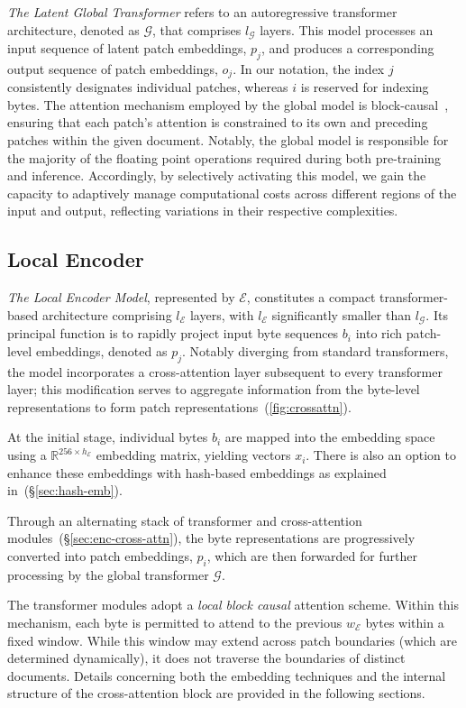 \textit{The Latent Global Transformer} refers to an autoregressive transformer architecture, denoted as $\mathcal{G}$, that comprises $l_{\mathcal{G}}$ layers. This model processes an input sequence of latent patch embeddings, $p_j$, and produces a corresponding output sequence of patch embeddings, $o_j$. In our notation, the index $j$ consistently designates individual patches, whereas $i$ is reserved for indexing bytes. The attention mechanism employed by the global model is block-causal~\citep{dubey2024llama}, ensuring that each patch's attention is constrained to its own and preceding patches within the given document. Notably, the global model is responsible for the majority of the floating point operations required during both pre-training and inference. Accordingly, by selectively activating this model, we gain the capacity to adaptively manage computational costs across different regions of the input and output, reflecting variations in their respective complexities.

\subsection{Local Encoder}
\label{section:local}

\textit{The Local Encoder Model}, represented by $\mathcal{E}$, constitutes a compact transformer-based architecture comprising $l_{\mathcal{E}}$ layers, with $l_{\mathcal{E}}$ significantly smaller than $l_{\mathcal{G}}$. Its principal function is to rapidly project input byte sequences $b_i$ into rich patch-level embeddings, denoted as $p_j$. Notably diverging from standard transformers, the model incorporates a cross-attention layer subsequent to every transformer layer; this modification serves to aggregate information from the byte-level representations to form patch representations~(\autoref{fig:crossattn}).

At the initial stage, individual bytes $b_i$ are mapped into the embedding space using a $\mathbb{R}^{256 \times h_{\mathcal{E}}}$ embedding matrix, yielding vectors $x_i$. There is also an option to enhance these embeddings with hash-based embeddings as explained in~(\S\ref{sec:hash-emb}).

Through an alternating stack of transformer and cross-attention modules~(\S\ref{sec:enc-cross-attn}), the byte representations are progressively converted into patch embeddings, $p_i$, which are then forwarded for further processing by the global transformer $\mathcal{G}$.

The transformer modules adopt a \textit{local block causal} attention scheme. Within this mechanism, each byte is permitted to attend to the previous $w_{\mathcal{E}}$ bytes within a fixed window. While this window may extend across patch boundaries (which are determined dynamically), it does not traverse the boundaries of distinct documents. Details concerning both the embedding techniques and the internal structure of the cross-attention block are provided in the following sections.

